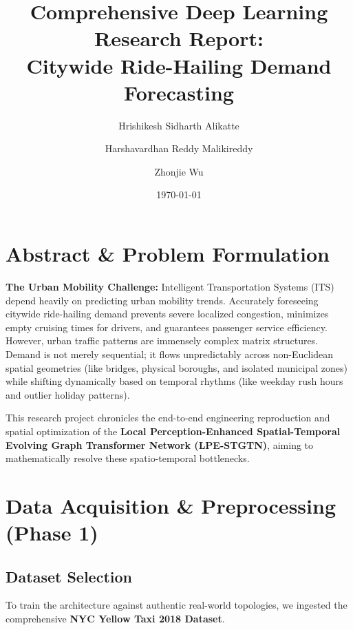 \documentclass[11pt,a4paper]{article}
\title{\textbf{Comprehensive Deep Learning Research Report: \\ Citywide Ride-Hailing Demand Forecasting}}
\author{Hrishikesh Sidharth Alikatte \and Harshavardhan Reddy Malikireddy \and Zhonjie Wu}
\date{\today}
\begin{document}
\maketitle

\section*{Abstract \& Problem Formulation}
\textbf{The Urban Mobility Challenge:} Intelligent Transportation Systems (ITS) depend heavily on predicting urban mobility trends. Accurately foreseeing citywide ride-hailing demand prevents severe localized congestion, minimizes empty cruising times for drivers, and guarantees passenger service efficiency. However, urban traffic patterns are immensely complex matrix structures. Demand is not merely sequential; it flows unpredictably across non-Euclidean spatial geometries (like bridges, physical boroughs, and isolated municipal zones) while shifting dynamically based on temporal rhythms (like weekday rush hours and outlier holiday patterns).

This research project chronicles the end-to-end engineering reproduction and spatial optimization of the \textbf{Local Perception-Enhanced Spatial-Temporal Evolving Graph Transformer Network (LPE-STGTN)}, aiming to mathematically resolve these spatio-temporal bottlenecks.

\section{Data Acquisition \& Preprocessing (Phase 1)}
\subsection{Dataset Selection}
To train the architecture against authentic real-world topologies, we ingested the comprehensive \textbf{NYC Yellow Taxi 2018 Dataset}.
\end{document}

